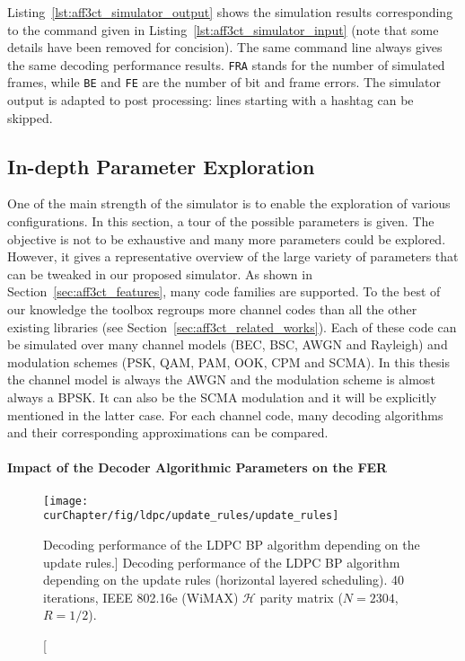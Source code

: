 \begin{listing}[htp]
  \inputminted[frame=lines,linenos]{console}{\curChapter/src/use_cases/simulator/output.txt}
  \caption{Example of an \AFFECT simulator output.}
  \label{lst:aff3ct_simulator_output}
\end{listing}

Listing~\ref{lst:aff3ct_simulator_output} shows the simulation results
corresponding to the \AFFECT command given in
Listing~\ref{lst:aff3ct_simulator_input} (note that some details have been
removed for concision). The same command line always gives the same decoding
performance results. \verb|FRA| stands for the number of simulated frames,
while \verb|BE| and \verb|FE| are the number of bit and frame errors. The
simulator output is adapted to post processing: lines starting with a hashtag
can be skipped.

\subsection{In-depth Parameter Exploration}

One of the main strength of the \AFFECT simulator is to enable the exploration
of various configurations. In this section, a tour of the possible parameters is
given. The objective is not to be exhaustive and many more parameters could be
explored. However, it gives a representative overview of the large variety of
parameters that can be tweaked in our proposed simulator. As shown in
Section~\ref{sec:aff3ct_features}, many code families are supported. To the best
of our knowledge the \AFFECT toolbox regroups more channel codes than all the
other existing libraries (see Section~\ref{sec:aff3ct_related_works}). Each of
these code can be simulated over many channel models (BEC, BSC, AWGN and
Rayleigh) and modulation schemes (PSK, QAM, PAM, OOK, CPM and SCMA). In this
thesis the channel model is always the AWGN and the modulation scheme is almost
always a BPSK. It can also be the SCMA modulation and it will be explicitly
mentioned in the latter case. For each channel code, many decoding algorithms
and their corresponding approximations can be compared.

\paragraph{Impact of the Decoder Algorithmic Parameters on the FER}

\begin{figure}[htp]
  \centering
  \texttt{[image: \\curChapter/fig/ldpc/update\_rules/update\_rules]}
  \caption
    [Decoding performance of the LDPC BP algorithm depending on the update
     rules.]
    {Decoding performance of the LDPC BP algorithm depending on the update rules
     (horizontal layered scheduling). 40 iterations, IEEE 802.16e (WiMAX)
     $\mathcal{H}$ parity matrix ($N=2304$, $R=1/2$).}
  \label{plot:aff3ct_ldpc_update_rules}
\end{figure}

